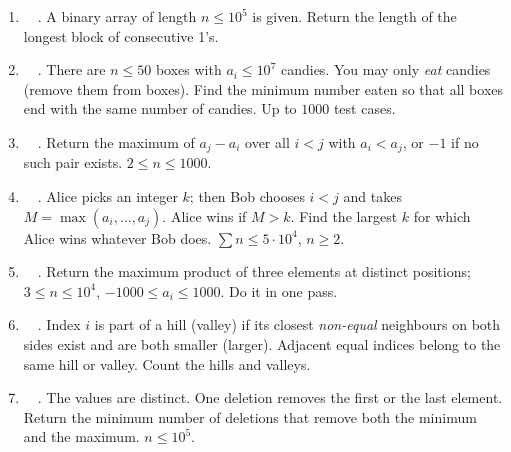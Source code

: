 \exlegend
\begin{enumerate}[leftmargin=*, label=\textbf{E1.\arabic*}, itemsep=6pt]\sloppy
    \item \exeasy\ \pclassic {}\ . A binary array of length $n \le 10^5$ is given. Return the length of the longest block of consecutive 1's.
    \item \exeasy\ \pconcept {}\ . There are $n \le 50$ boxes with $a_i \le 10^7$ candies. You may only \emph{eat} candies (remove them from boxes). Find the minimum number eaten so that all boxes end with the same number of candies. Up to $1000$ test cases.
    \item \exeasy\ \pconcept {}\ . Return the maximum of $a_j - a_i$ over all $i < j$ with $a_i < a_j$, or $-1$ if no such pair exists. $2 \le n \le 1000$.
    \item \exeasy\ \precent {}\ . Alice picks an integer $k$; then Bob chooses $i < j$ and takes $M = \max(a_i, \dots, a_j)$. Alice wins if $M > k$. Find the largest $k$ for which Alice wins whatever Bob does. $\sum n \le 5\cdot10^4$, $n \ge 2$.
    \item \exmedium\ \ptricky {}\ . Return the maximum product of three elements at distinct positions; $3 \le n \le 10^4$, $-1000 \le a_i \le 1000$. Do it in one pass.
    \item \exmedium\ \ptricky {}\ . Index $i$ is part of a hill (valley) if its closest \emph{non-equal} neighbours on both sides exist and are both smaller (larger). Adjacent equal indices belong to the same hill or valley. Count the hills and valleys.
    \item \exmedium\ \pclassic {}\ . The values are distinct. One deletion removes the first or the last element. Return the minimum number of deletions that remove both the minimum and the maximum. $n \le 10^5$.
\end{enumerate}

